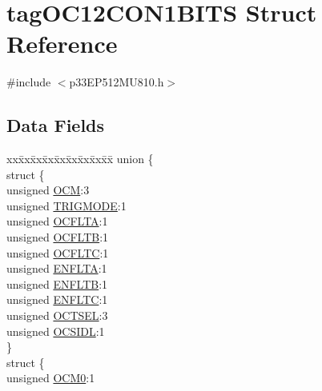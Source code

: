 \hypertarget{structtag_o_c12_c_o_n1_b_i_t_s}{}\section{tag\+O\+C12\+C\+O\+N1\+B\+I\+TS Struct Reference}
\label{structtag_o_c12_c_o_n1_b_i_t_s}


{\ttfamily \#include $<$p33\+E\+P512\+M\+U810.\+h$>$}

\subsection*{Data Fields}
\begin{DoxyCompactItemize}
\item 
\begin{tabbing}
xx\=xx\=xx\=xx\=xx\=xx\=xx\=xx\=xx\=\kill
union \{\\
\>struct \{\\
\>\>unsigned \hyperlink{structtag_o_c12_c_o_n1_b_i_t_s_a778fa0cf51a9477ac4e82d71a8733801}{OCM}:3\\
\>\>unsigned \hyperlink{structtag_o_c12_c_o_n1_b_i_t_s_a7a0057e0dca6e2663584b5b9e1da04c3}{TRIGMODE}:1\\
\>\>unsigned \hyperlink{structtag_o_c12_c_o_n1_b_i_t_s_acc967e41cecdeedc6ad4422f9ef1a6a3}{OCFLTA}:1\\
\>\>unsigned \hyperlink{structtag_o_c12_c_o_n1_b_i_t_s_a1fb30bb4421ef7c4bd0c66c379875593}{OCFLTB}:1\\
\>\>unsigned \hyperlink{structtag_o_c12_c_o_n1_b_i_t_s_a69a1772a4144abd579d17d28445b9934}{OCFLTC}:1\\
\>\>unsigned \hyperlink{structtag_o_c12_c_o_n1_b_i_t_s_a1e0f05fb23d516e003e4713fe8c1498a}{ENFLTA}:1\\
\>\>unsigned \hyperlink{structtag_o_c12_c_o_n1_b_i_t_s_a9d7aa97d5328b8b81ab7fd9145dfa0fc}{ENFLTB}:1\\
\>\>unsigned \hyperlink{structtag_o_c12_c_o_n1_b_i_t_s_a0b6f25c0f83f33b5501b6a2e6141a6ef}{ENFLTC}:1\\
\>\>unsigned \hyperlink{structtag_o_c12_c_o_n1_b_i_t_s_ae37d2a41dae2d2af1d82f7caae33cadb}{OCTSEL}:3\\
\>\>unsigned \hyperlink{structtag_o_c12_c_o_n1_b_i_t_s_afd05f4f249db4ef69b684e2f3fa6b703}{OCSIDL}:1\\
\>\} \\
\>struct \{\\
\>\>unsigned \hyperlink{structtag_o_c12_c_o_n1_b_i_t_s_a9271e84c9759ff10a7bc1cee3276e8f6}{OCM0}:1\\

\end{tabbing}
\end{DoxyCompactItemize}
